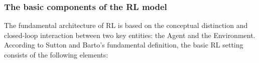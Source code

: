 %

\subsubsection{The basic components of the RL model}
The fundamental architecture of RL is based on the conceptual distinction and closed-loop interaction between two key entities: the Agent and the Environment. According to Sutton and Barto’s \cite{sutton2018reinforcement} fundamental definition, the basic RL setting consists of the following elements:

